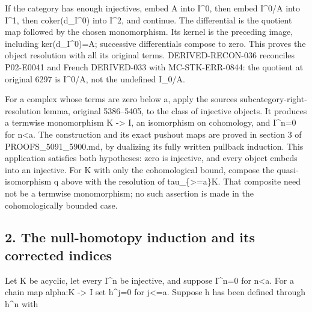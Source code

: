If the category has enough injectives,\allowbreak{} embed A into I\textasciicircum{}0,\allowbreak{} then embed I\textasciicircum{}0/\allowbreak{}A into I\textasciicircum{}1,\allowbreak{} then coker(d\_\allowbreak{}I\textasciicircum{}0)\allowbreak{} into I\textasciicircum{}2,\allowbreak{} and continue. The differential is the quotient map followed by the chosen monomorphism. Its kernel is the preceding image,\allowbreak{} including ker(d\_\allowbreak{}I\textasciicircum{}0)\allowbreak{}\allowbreak{}=A; successive differentials compose to zero. This proves the object resolution with all its original terms. DERIVED-RECON-036 reconciles P02-E0041 and French DERIVED-033 with MC-STK-ERR-0844:\allowbreak{} the quotient at original 6297 is I\textasciicircum{}0/\allowbreak{}A,\allowbreak{} not the undefined I\_\allowbreak{}0/\allowbreak{}A.

For a complex whose terms are zero below a,\allowbreak{} apply the source\textquotesingle s subcategory-right-resolution lemma,\allowbreak{} original 5386–\allowbreak{}5405,\allowbreak{} to the class of injective objects. It produces a termwise monomorphism K \allowbreak{}-> I,\allowbreak{} an isomorphism on cohomology,\allowbreak{} and I\textasciicircum{}n\allowbreak{}=0 for n\textless a. The construction and its exact pushout maps are proved in section 3 of PROOFS\_\allowbreak{}5091\_\allowbreak{}5900.md,\allowbreak{} by dualizing its fully written pullback induction. This application satisfies both hypotheses:\allowbreak{} zero is injective,\allowbreak{} and every object embeds into an injective. For K with only the cohomological bound,\allowbreak{} compose the quasi-isomorphism q above with the resolution of tau\_\allowbreak{}\{>\allowbreak{}=a\}K. That composite need not be a termwise monomorphism; no such assertion is made in the cohomologically bounded case.

\subsection{2. The null-homotopy induction and its corrected indices}\label{proofs-6209-7089-the-null-homotopy-induction-and-its-corrected-indices}

Let K be acyclic,\allowbreak{} let every I\^{}n be injective,\allowbreak{} and suppose I\textasciicircum{}n\allowbreak{}=0 for n\textless a. For a chain map alpha:\allowbreak{}K \allowbreak{}-> I set h\textasciicircum{}j\allowbreak{}=0 for j<\allowbreak{}=a. Suppose h has been defined through h\^{}n with

